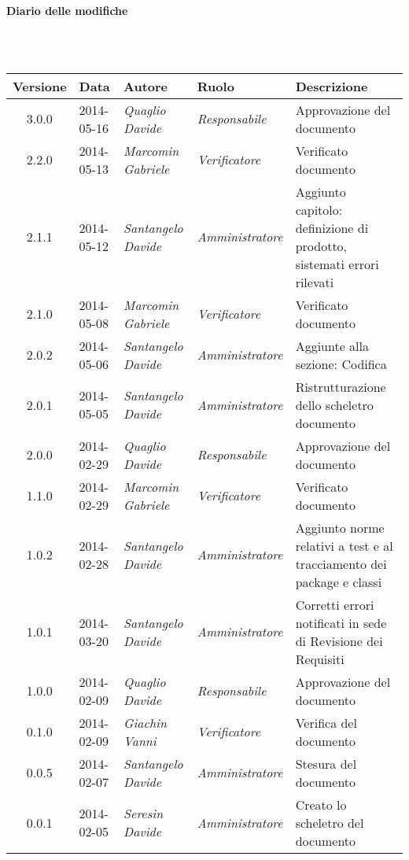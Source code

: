 \noindent\begin{Large}\textbf{Diario delle modifiche}\end{Large}\\
\\
\begin{small}
\begin{tabular}{|c|p{1.8cm}|p{2.8cm}|p{2.8cm}|p{3.5cm}|}
\hline
Versione & Data & Autore & Ruolo & Descrizione \\
\hline
3.0.0 & 2014-05-16 & 
\textit{Quaglio Davide} &
\textit{Responsabile} & Approvazione del documento\\
\hline
2.2.0 & 2014-05-13 & 
\textit{Marcomin Gabriele} &
\textit{Verificatore} & Verificato documento\\
\hline
2.1.1 & 2014-05-12 & 
\textit{Santangelo Davide} &
\textit{Amministratore} & Aggiunto capitolo: definizione di prodotto, sistemati errori rilevati\\
\hline
2.1.0 & 2014-05-08 & 
\textit{Marcomin Gabriele} &
\textit{Verificatore} & Verificato documento\\
\hline
2.0.2 & 2014-05-06 & 
\textit{Santangelo Davide} &
\textit{Amministratore} & Aggiunte alla sezione: Codifica\\
\hline
2.0.1 & 2014-05-05 & 
\textit{Santangelo Davide} &
\textit{Amministratore} & Ristrutturazione dello scheletro documento\\
\hline
2.0.0 & 2014-02-29 & 
\textit{Quaglio Davide} &
\textit{Responsabile} & Approvazione del documento\\
\hline
1.1.0 & 2014-02-29 & 
\textit{Marcomin Gabriele} &
\textit{Verificatore} & Verificato documento\\
\hline
1.0.2 & 2014-02-28 & 
\textit{Santangelo Davide} &
\textit{Amministratore} &  Aggiunto norme relativi a test e al tracciamento dei package e classi\\
\hline
1.0.1 & 2014-03-20 & 
\textit{Santangelo Davide} &
\textit{Amministratore} &  Corretti errori notificati in sede di Revisione dei Requisiti\\
\hline
1.0.0 & 2014-02-09 & 
\textit{Quaglio Davide} &
\textit{Responsabile} &  Approvazione del documento\\
\hline
0.1.0 & 2014-02-09 & 
\textit{Giachin Vanni} &
\textit{Verificatore} &  Verifica del documento\\
\hline
0.0.5 & 2014-02-07 & 
\textit{Santangelo Davide} &
\textit{Amministratore} &  Stesura del documento\\
\hline
0.0.1 & 2014-02-05 & 
\textit{Seresin Davide} &
\textit{Amministratore} &  Creato lo scheletro del documento\\
\hline
\end{tabular}\\
\end{small}
